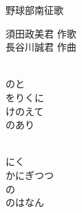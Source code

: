 \documentclass[10pt,b5j]{tarticle} %
\begin{document}
\begin{minipage}[c]{0.7\hsize} %
    \begin{center}
        {\LARGE
            野球部南征歌 %
        }
        {\small 
        }
    \end{center}
\end{minipage}
\begin{minipage}[c]{0.3\hsize} %
    \begin{flushright} %
        須田政美君 作歌\\長谷川誠君 作曲 %
    \end{flushright}
\end{minipage}

\vspace{1.5em} %
\newcommand{\linespace}{0.5em} %
\newcommand{\blocksize}{0.5\hsize} %
\newcommand{\itemmargin}{3em} %
\begin{enumerate} %
    \setlength{\itemindent}{\itemmargin} %
    \begin{minipage}[c]{\blocksize}
    
        \vspace{\linespace}
        \item~\\
        のと\\
        をりくに\\
        けのえて\\
        のあり
        
    \end{minipage}
    \begin{minipage}[c]{\blocksize}
        
        \vspace{\linespace}
        \item~\\
        にく\\
        かにぎつつ\\
        の\\
        のはなん
    
    \end{minipage}
\end{enumerate} %
\end{document}
